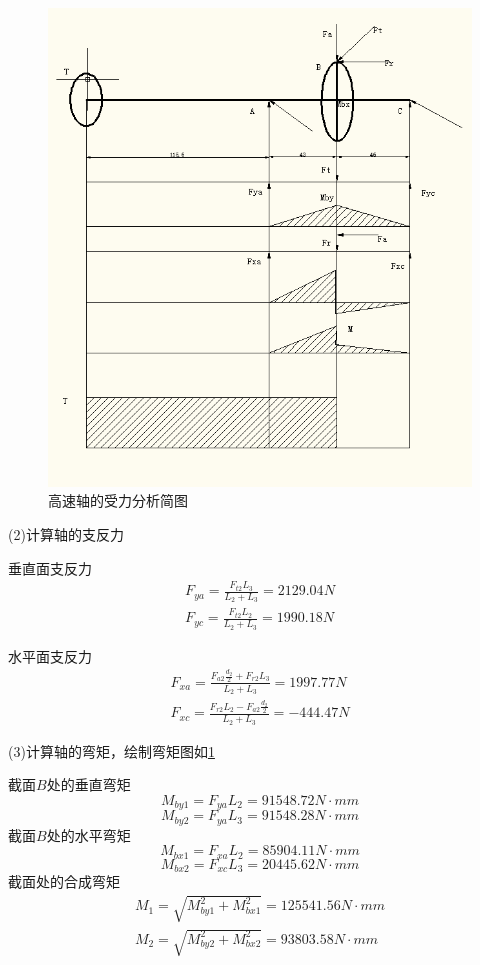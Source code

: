 \begin{figure}[h]
    \centering
    \includegraphics[scale=0.8]{graphic/5-4.png}
    \caption{高速轴的受力分析简图}
    \label{img2}
\end{figure}

(2)计算轴的支反力

垂直面支反力
\begin{align*}
    F_{ya}=\frac{F_{t2}L_3}{L_2+L_3}=2129.04N\\
    F_{yc}=\frac{F_{t2}L_2}{L_2+L_3}=1990.18N
\end{align*}

水平面支反力
\begin{align*}
    F_{xa}=\frac{F_{a2}{\frac{d_2}{2}}+F_{r2}L_3}{L_2+L_3} =1997.77N \\
    F_{xc}=\frac{F_{r2}{L_2}-F_{a2}\frac{d_2}{2}}{L_2+L_3}=-444.47N
\end{align*}

(3)计算轴的弯矩，绘制弯矩图如\ref{img2}

截面$B$处的垂直弯矩
\[
    M_{by1}=F_{ya}L_2=91548.72N\cdot mm
\]
\[
    M_{by2}=F_{ya}L_3=91548.28N\cdot mm
\]
截面$B$处的水平弯矩
\[
    M_{bx1}=F_{xa}L_2=85904.11N\cdot mm
\]
\[
    M_{bx2}=F_{xc}L_3=20445.62N\cdot mm
\]
截面处的合成弯矩
\begin{align*}
    M_1=\sqrt{M_{by1}^2+M_{bx1}^2}=125541.56N\cdot mm\\
    M_2=\sqrt{M_{by2}^2+M_{bx2}^2}=93803.58N\cdot mm
\end{align*}

